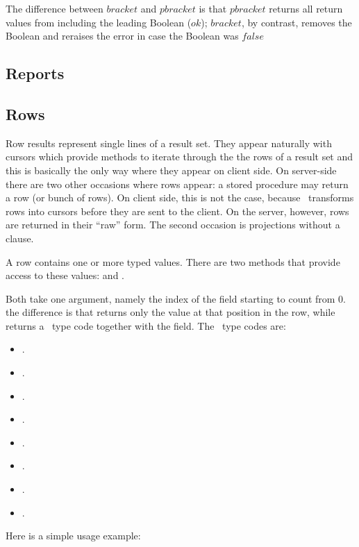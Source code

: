 The difference between $bracket$ and $pbracket$ is
that $pbracket$ returns all return values from 
including the leading Boolean ($ok$);
$bracket$, by contrast, removes the Boolean
and reraises the error in case the Boolean was $false$

\subsection{Reports}

\subsection{Rows}
Row results represent single lines of a result set.
They appear naturally with cursors which provide
methods to iterate through the the rows of a result set
and this is basically the only way where they
appear on client side. On server-side there are two
other occasions where rows appear:
a stored procedure may return a row (or bunch of rows).
On client side, this is not the case, because \nowdb\
transforms rows into cursors before they are sent to
the client. On the server, however, rows are returned in
their ``raw'' form.
The second occasion is projections
without a  clause.

A row contains one or more typed values.
There are two methods that provide access to these values:
 and .

Both take one argument, namely the index of the field
starting to count from 0. the difference is that
 returns only the value at that position
in the row, while 
returns a \nowdb\ type code together with the field.
The \nowdb\ type codes are:

\begin{itemize}
\item {}.
\item {}.
\item {}.
\item {}.
\item {}.
\item {}.
\item {}.
\item \term{nowdb}.
\end{itemize}

Here is a simple usage example:


